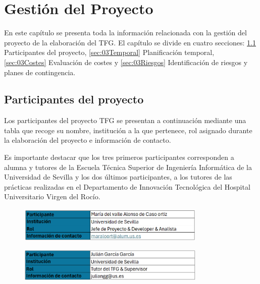 \chapter{Gestión del Proyecto}\label{cap:03gestión}

En este capítulo se presenta toda la información relacionada con la gestión del proyecto de la elaboración del TFG. El capítulo se divide en cuatro secciones: \ref{sec:03Participantes} Participantes del proyecto,
\ref{sec:03Temporal} Planificación temporal, \ref{sec:03Costes} Evaluación de costes y \ref{sec:03Riesgos} Identificación de riesgos y planes de contingencia.

\section{Participantes del proyecto} \label{sec:03Participantes}

Los participantes del proyecto TFG se presentan a continuación mediante una tabla que recoge su nombre, institución a la que pertenece, rol asignado durante la elaboración del proyecto e información de contacto. 

Es importante destacar que los tres primeros participantes corresponden a alumna y tutores de la Escuela Técnica Superior de Ingeniería Informática de la Universidad de Sevilla y los dos últimos participantes, a los tutores de las prácticas realizadas en el Departamento de Innovación Tecnológica del Hospital Universitario Virgen del Rocío.

%

\begin{figure}[H]
    \centering
    \includegraphics[width=0.80\textwidth]{tables/primerParticipante.png}
    \label{table:primerParticipante}
\end{figure}

\begin{figure}[H]
    \centering
    \includegraphics[width=0.80\textwidth]{tables/segundoParticipante.png}
    \label{table:segundoParticipante}
\end{figure}

